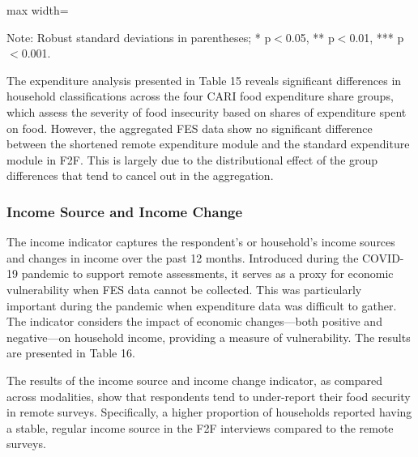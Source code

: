 \documentclass[11pt,harvard]{article}
\begin{document}
	\begin{table}[htbp]
		\centering
		\begin{adjustbox}{max width=\textwidth}%
			\begin{threeparttable}
				\caption{Impact of Survey Modality on Food Expenditure Share}
				\scriptsize%
				 
				\label{tab:FES_Modality_BF}
				\begin{tablenotes}
					\item Note: Robust standard deviations in parentheses; * p$<$0.05, ** p$<$0.01, *** p$<$0.001.
				\end{tablenotes}
			\end{threeparttable}
		\end{adjustbox}
	\end{table}
	
	The expenditure analysis presented in Table 15 reveals significant differences in household classifications across the four CARI food expenditure share groups, which assess the severity of food insecurity based on shares of expenditure spent on food. However, the aggregated FES data show no significant difference between the shortened remote expenditure module and the standard expenditure module in F2F. This is largely due to the distributional effect of the group differences that tend to cancel out in the aggregation.
	
	\subsubsection{Income Source and Income Change}
	The income indicator captures the respondent's or household's income sources and changes in income over the past 12 months. Introduced during the COVID-19 pandemic to support remote assessments, it serves as a proxy for economic vulnerability when FES data cannot be collected. This was particularly important during the pandemic when expenditure data was difficult to gather. The indicator considers the impact of economic changes—both positive and negative—on household income, providing a measure of vulnerability. The results are presented in Table 16.

	The results of the income source and income change indicator, as compared across modalities, show that respondents tend to under-report their food security in remote surveys. Specifically, a higher proportion of households reported having a stable, regular income source in the F2F interviews compared to the remote surveys. 
	
\end{document}
